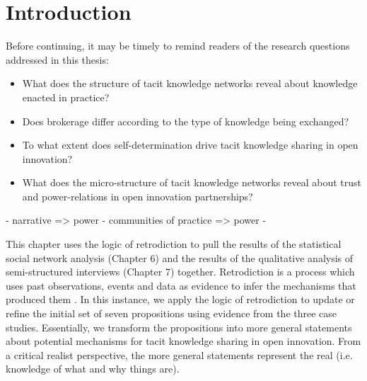 \section{Introduction}


Before continuing, it may be timely to remind readers of the research questions addressed in this thesis:

\begin{itemize}
\item What does the structure of tacit knowledge networks reveal about knowledge enacted in practice?
\item Does brokerage differ according to the type of knowledge being exchanged?
\item To what extent does self-determination drive tacit knowledge sharing in open innovation?
\item What does the micro-structure of tacit knowledge networks reveal about trust and power-relations in open innovation partnerships?
\end{itemize}

- narrative => power
- communities of practice => power
- 



This chapter uses the logic of retrodiction to pull the results of the statistical social network analysis (Chapter 6) and the results of the qualitative analysis of semi-structured interviews (Chapter 7) together. Retrodiction is a process which uses past observations, events and data as evidence to infer the mechanisms that produced them \citep{wynn2012principles}. In this instance, we apply the logic of retrodiction to update or refine the initial set of seven propositions using evidence from the three case studies. Essentially, we transform the propositions into more general statements about potential mechanisms for tacit knowledge sharing in open innovation. From a critical realist perspective, the more general statements represent the real (i.e. knowledge of what and why things are).


